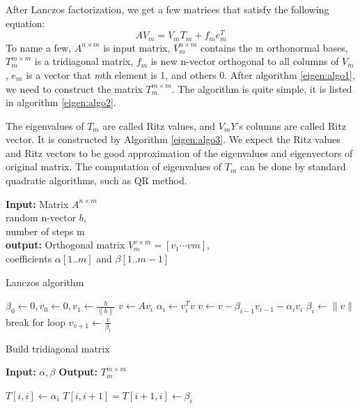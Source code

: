 After Lanczos factorization, we get a few matrices that satisfy the following equation:
\begin{equation}
	AV_{m} = V_{m}T_{m} + f_{m}e^{T}_{m}
\end{equation}
To name a few, $A^{n\times m}$ is input matrix, $V^{n\times m}_{m}$ contains the m orthonormal bases, $T^{m\times m}_{m}$ is a tridiagonal matrix, $f_{m}$ is new n-vector orthogonal to all columns of $V_{m}$, $
e_{m}$ is a vector that \emph{m}th element is 1, and others 0. After algorithm \ref{eigen:algo1}, we need to construct the matrix $T^{m\times m}_{m}$. The algorithm is quite simple, it is listed in algorithm \ref{eigen:algo2}. 

The eigenvalues of $T_{m}$ are called Ritz values, and $V_{m}Y$'s columns are called Ritz vector. It is constructed by Algorithm \ref{eigen:algo3}. We expect the Ritz values and Ritz vectors to be good approximation of the eigenvalues and eigenvectors of original matrix. The computation of eigenvalues of $T_{m}$ can be done by standard quadratic algorithms, such as QR method. 

\begin{algorithm}
{\bf Input:} Matrix $A^{n \times m}$\\
random n-vector $b$,\\
number of steps m\\
{\bf output:} Orthogonal matrix $ V^{v \times m}_{m} = [v_{1}\cdots v{m}]$,\\
coefficients $\alpha[1..m]$ and $\beta[1..m-1]$
\begin{algorithmic}[1]
\caption{Lanczos algorithm}
\STATE $\beta_{0} \leftarrow 0, v_{0} \leftarrow 0, v_{1} \leftarrow \frac{b}{\parallel b \parallel}$ 
	\STATE $v \leftarrow Av_{i}$
	\STATE $\alpha_{i} \leftarrow v^{T}_{i}v $
	\STATE $v \leftarrow v - \beta_{i-1}v_{i-1} - \alpha_{i}v_{i}$
	\STATE $\beta_{i} \leftarrow \parallel v\parallel $
	\STATE break for loop 
	\ENDIF
	\STATE $ v_{v+1} \leftarrow \frac{v}{\beta_{i}} $
\ENDFOR
\end{algorithmic}
\label{eigen:algo1}
\end{algorithm}

\begin{algorithm}
\caption{Build tridiagonal matrix}
{\bf Input:} $\alpha, \beta$
{\bf Output:} $T^{m\times m}_{m}$
\begin{algorithmic}[1]
	\STATE $T[i, i] \leftarrow \alpha_{i} $
	\STATE $T[i, i+1] = T[i+1, i] \leftarrow \beta_{i}$
\ENDFOR	
\end{algorithmic}
\label{eigen:algo2}
\end{algorithm}


